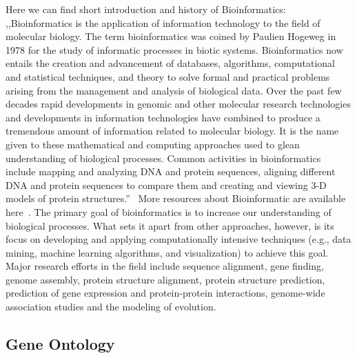 Here we can find short introduction and history of Bioinformatics: ,,Bioinformatics is the application of information technology to the field of molecular biology.
The term bioinformatics was coined by Paulien Hogeweg in 1978 for the study of informatic processes in biotic systems.
Bioinformatics now entails the creation and advancement of databases, algorithms, computational and statistical techniques, and theory to solve formal and practical problems arising from the management and analysis of biological data.
Over the past few decades rapid developments in genomic and other molecular research technologies and developments in information technologies have combined to produce a tremendous amount of information related to molecular biology.
It is the name given to these mathematical and computing approaches used to glean understanding of biological processes.
Common activities in bioinformatics include mapping and analyzing DNA and protein sequences, aligning different DNA and protein sequences to compare them and creating and viewing 3-D models of protein structures.''~\cite{Bioinformatic}
More resources about Bioinformatic are available here~\cite{Bioinformatic_resources}.
The primary goal of bioinformatics is to increase our understanding of biological processes.
What sets it apart from other approaches, however, is its focus on developing and applying computationally intensive techniques (e.g., data mining, machine learning algorithms, and visualization) to achieve this goal.
Major research efforts in the field include sequence alignment, gene finding, genome assembly, protein structure alignment, protein structure prediction, prediction of gene expression and protein-protein interactions, genome-wide association studies and the modeling of evolution.

\subsection{Gene Ontology}
\label{sec:gene_ontology}


